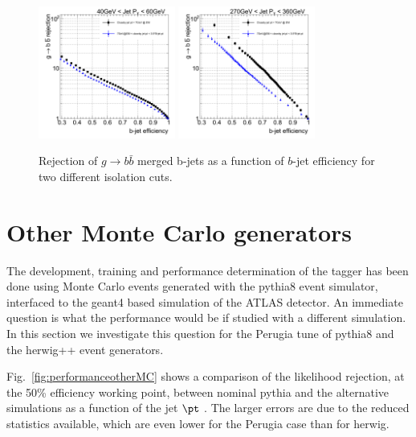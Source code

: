 \begin{figure}[tp]
\centering
\includegraphics[width=0.4\textwidth]{FIGS/systematics/DiffIsolationCutsKDE_RejvsEff40.png}
\includegraphics[width=0.4\textwidth]{FIGS/systematics/DiffIsolationCutsKDE_RejvsEff270.png}
\caption{Rejection of $g\rightarrow b \bar{b}$ merged b-jets as a function of $b$-jet efficiency for two different isolation cuts.}
\label{fig:testisolation}
\end{figure}


\section{Other Monte Carlo generators}\label{sec:otherMC}

The development, training and performance determination of the tagger has been done using Monte Carlo events generated with the {\sc pythia8} event simulator, interfaced to the {\sc geant4} based simulation of the ATLAS detector. An immediate question is what the performance would be if studied with a different simulation. In this section we investigate this question for the Perugia tune of {\sc pythia8} and the {\sc herwig++} event generators.

Fig.~\ref{fig:performanceotherMC} shows a comparison of the likelihood rejection, at the 50\% efficiency working point,  between nominal {\sc pythia} and the alternative simulations %
as a function of the jet $\pt$ . The larger errors are due to the reduced statistics available, which are even lower for the Perugia case than for {\sc herwig}.



